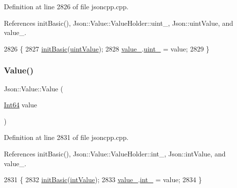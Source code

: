 Definition at line 2826 of file jsoncpp.\+cpp.



References init\+Basic(), Json\+::\+Value\+::\+Value\+Holder\+::uint\+\_\+, Json\+::uint\+Value, and value\+\_\+.


\begin{DoxyCode}
2826                        \{
2827   \hyperlink{class_json_1_1_value_a32b86b71564157f40f880f5736be822a}{initBasic}(\hyperlink{namespace_json_a7d654b75c16a57007925868e38212b4eaea788d9a3bb00adc6d68d97d43e1ccd3}{uintValue});
2828   \hyperlink{class_json_1_1_value_aef578244546212705b9f81eb84d7e151}{value\_}.\hyperlink{union_json_1_1_value_1_1_value_holder_aab65665dc15a24a29a8e93cdeeaa7e50}{uint\_} = value;
2829 \}
\end{DoxyCode}
\mbox{\label{class_json_1_1_value_ab1cdc3d9a4d4cc03fa01439d43ceb1b5}} 
\subsubsection{\texorpdfstring{Value()}{Value()}\hspace{0.1cm}{\footnotesize\ttfamily [4/12]}}
{\footnotesize\ttfamily Json\+::\+Value\+::\+Value (\begin{DoxyParamCaption}\item[{\hyperlink{class_json_1_1_value_a1b86af9f85f0f1baa972c3319fa22695}{Int64}}]{value }\end{DoxyParamCaption})}



Definition at line 2831 of file jsoncpp.\+cpp.



References init\+Basic(), Json\+::\+Value\+::\+Value\+Holder\+::int\+\_\+, Json\+::int\+Value, and value\+\_\+.


\begin{DoxyCode}
2831                         \{
2832   \hyperlink{class_json_1_1_value_a32b86b71564157f40f880f5736be822a}{initBasic}(\hyperlink{namespace_json_a7d654b75c16a57007925868e38212b4eae5a9d708d5c9e23ae9bf98898522512d}{intValue});
2833   \hyperlink{class_json_1_1_value_aef578244546212705b9f81eb84d7e151}{value\_}.\hyperlink{union_json_1_1_value_1_1_value_holder_adbfb384301298844ed955ba5cf6015a0}{int\_} = value;
2834 \}
\end{DoxyCode}
\mbox{\label{class_json_1_1_value_a8adda58d5ae17bf7ca6a53bab4a7b69c}} 
